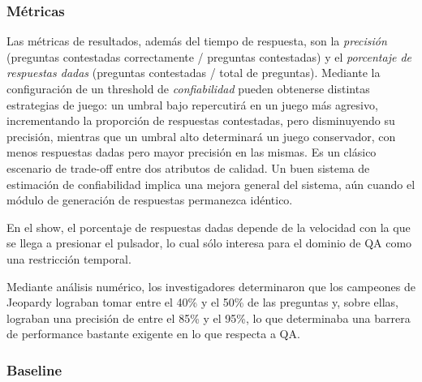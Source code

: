 \subsubsection*{Métricas}

Las métricas de resultados, además del tiempo de respuesta, son la
\textit{precisión} (preguntas contestadas correctamente / preguntas
contestadas) y el \textit{porcentaje de respuestas dadas }(preguntas
contestadas / total de preguntas). Mediante la configuración de un
threshold de \textit{confiabilidad} pueden obtenerse distintas
estrategias de juego: un umbral bajo repercutirá en un juego más
agresivo, incrementando la proporción de respuestas contestadas,
pero disminuyendo su precisión, mientras que un umbral alto
determinará un juego conservador, con menos respuestas dadas pero
mayor precisión en las mismas. Es un clásico escenario de trade-off
entre dos atributos de calidad. Un buen sistema de estimación de
confiabilidad implica una mejora general del sistema, aún cuando el
módulo de generación de respuestas permanezca idéntico.

En el show, el porcentaje de respuestas dadas depende de la velocidad
con la que se llega a presionar el pulsador, lo cual sólo interesa
para el dominio de QA como una restricción temporal.

Mediante análisis numérico, los investigadores determinaron que los
campeones de Jeopardy lograban tomar entre el 40\% y el 50\% de las
preguntas y, sobre ellas, lograban una precisión de entre el 85\% y
el 95\%, lo que determinaba una barrera de performance bastante
exigente en lo que respecta a QA.

\bigskip

\subsubsection*{Baseline}

